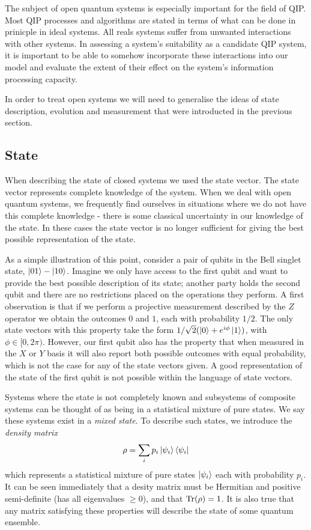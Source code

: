 The subject of open quantum systems is especially important for the field of QIP. Most QIP processes and algorithms are stated in terms of what can be done in prinicple in ideal systems. All reals systems suffer from unwanted interactions with other systems. In assessing a system's suitability as a candidate QIP system, it is important to be able to somehow incorporate these interactions into our model and evaluate the extent of their effect on the system's information processing capacity.

In order to treat open systems we will need to generalise the ideas of state description, evolution and measurement that were introducted in the previous section.



\subsection{State}

When describing the state of closed systems we used the state vector. The state vector represents complete knowledge of the system. When we deal with open quantum systems, we frequently find ourselves in situations where we do not have this complete knowledge - there is some classical uncertainty in our knowledge of the state. In these cases the state vector is no longer sufficient for giving the best possible representation of the state. 

As a simple illustration of this point, consider a pair of qubits in the Bell singlet state, $\left\vert01\right\rangle - \left\vert10\right\rangle$. Imagine we only have access to the first qubit and want to provide the best possible description of its state; another party holds the second qubit and there are no restrictions placed on the operations they perform. A first observation is that if we perform a projective measurement described by the $Z$ operator we obtain the outcomes $0$ and $1$, each with probability $1/2$. The only state vectors with this property take the form $1/\sqrt{2}(\left\vert0\right\rangle + e^{i\phi}\left\vert1\right\rangle)$, with $\phi \in [0, 2\pi)$. However, our first qubit also has the property that when measured in the $X$ or $Y$ basis it will also report both possible outcomes with equal probability, which is not the case for any of the state vectors given. A good representation of the state of the first qubit is not possible within the language of state vectors.

Systems where the state is not completely known and subsystems of composite systems can be thought of as being in a statistical mixture of pure states. We say these systems exist in a \textit{mixed state}. To describe such states, we introduce the \textit{density matrix}
\begin{align}
  \rho = \sum_i p_i \left\vert\psi_i\right\rangle\left\langle \psi_i\right\vert 
\end{align}
which represents a statistical mixture of pure states $\left\vert\psi_i\right\rangle$ each with probability $p_i$. It can be seen immediately that a desity matrix must be Hermitian and positive semi-definite (has all eigenvalues $\geq 0$), and that $\operatorname{Tr}(\rho) = 1$. It is also true that any matrix satisfying these properties will describe the state of some quantum ensemble.

